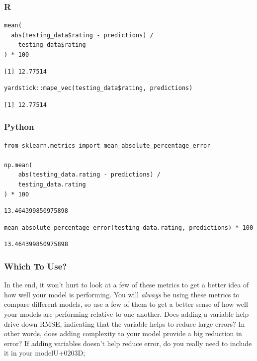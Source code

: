 \documentclass[
  letterpaper,
]{krantz}
\begin{document}
\subsubsection{R}

\begin{verbatim}
mean(
  abs(testing_data$rating - predictions) / 
    testing_data$rating
) * 100
\end{verbatim}

\begin{verbatim}
[1] 12.77514
\end{verbatim}

\begin{verbatim}
yardstick::mape_vec(testing_data$rating, predictions)
\end{verbatim}

\begin{verbatim}
[1] 12.77514
\end{verbatim}

\subsubsection{Python}

\begin{verbatim}
from sklearn.metrics import mean_absolute_percentage_error

np.mean(
    abs(testing_data.rating - predictions) / 
    testing_data.rating
) * 100
\end{verbatim}

\begin{verbatim}
13.464399850975898
\end{verbatim}

\begin{verbatim}
mean_absolute_percentage_error(testing_data.rating, predictions) * 100
\end{verbatim}

\begin{verbatim}
13.464399850975898
\end{verbatim}

\subsubsection{Which To Use?}\label{which-to-use}

In the end, it won't hurt to look at a few of these metrics to get a
better idea of how well your model is performing. You will \emph{always}
be using these metrics to compare different models, so use a few of them
to get a better sense of how well your models are performing relative to
one another. Does adding a variable help drive down RMSE, indicating
that the variable helps to reduce large errors? In other words, does
adding complexity to your model provide a big reduction in error? If
adding variables doesn't help reduce error, do you really need to
include it in your modelU+0203D;
\end{document}
